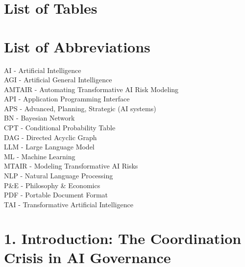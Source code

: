 \documentclass[
  11pt,
  letterpaper,
]{book}
\begin{document}


\chapter*{List of Tables}\label{list-of-tables}



\chapter*{List of Abbreviations}\label{list-of-abbreviations-1}


AI - Artificial Intelligence\\
AGI - Artificial General Intelligence\\
AMTAIR - Automating Transformative AI Risk Modeling\\
API - Application Programming Interface\\
APS - Advanced, Planning, Strategic (AI systems)\\
BN - Bayesian Network\\
CPT - Conditional Probability Table\\
DAG - Directed Acyclic Graph\\
LLM - Large Language Model\\
ML - Machine Learning\\
MTAIR - Modeling Transformative AI Risks\\
NLP - Natural Language Processing\\
P\&E - Philosophy \& Economics\\
PDF - Portable Document Format\\
TAI - Transformative Artificial Intelligence


\chapter*{1. Introduction: The Coordination Crisis in AI
Governance}\label{sec-introduction}
\end{document}
